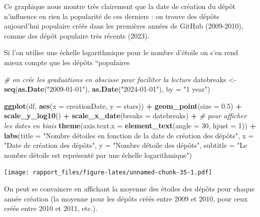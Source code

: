 \documentclass[
]{article}
\newenvironment{Shaded}{\begin{snugshade}}{\end{snugshade}}
\newcommand{\AttributeTok}[1]{\textcolor[rgb]{0.13,0.29,0.53}{#1}}
\newcommand{\CommentTok}[1]{\textcolor[rgb]{0.56,0.35,0.01}{\textit{#1}}}
\newcommand{\DecValTok}[1]{\textcolor[rgb]{0.00,0.00,0.81}{#1}}
\newcommand{\FloatTok}[1]{\textcolor[rgb]{0.00,0.00,0.81}{#1}}
\newcommand{\FunctionTok}[1]{\textcolor[rgb]{0.13,0.29,0.53}{\textbf{#1}}}
\newcommand{\NormalTok}[1]{#1}
\newcommand{\OtherTok}[1]{\textcolor[rgb]{0.56,0.35,0.01}{#1}}
\newcommand{\SpecialCharTok}[1]{\textcolor[rgb]{0.81,0.36,0.00}{\textbf{#1}}}
\newcommand{\StringTok}[1]{\textcolor[rgb]{0.31,0.60,0.02}{#1}}
\begin{document}
Ce graphique nous montre très clairement que la date de création du
dépôt n'influence en rien la popularité de ces derniers : on trouve des
dépôts aujourd'hui populaire créés dans les premières années de GitHub
(2009-2010), comme des dépôt populaire très récents (2023).

Si l'on utilise une échelle logarithmique pour le nombre d'étoile on
s'en rend mieux compte que les dépôts ``populaires

\begin{Shaded}
\begin{Highlighting}[]
\CommentTok{\# on crée les graduations en abscisse pour faciliter la lecture}
\NormalTok{datebreaks }\OtherTok{\textless{}{-}} \FunctionTok{seq}\NormalTok{(}\FunctionTok{as.Date}\NormalTok{(}\StringTok{"2009{-}01{-}01"}\NormalTok{), }\FunctionTok{as.Date}\NormalTok{(}\StringTok{"2024{-}01{-}01"}\NormalTok{), }\AttributeTok{by =} \StringTok{"1 year"}\NormalTok{)}

\FunctionTok{ggplot}\NormalTok{(df, }\FunctionTok{aes}\NormalTok{(}\AttributeTok{x =}\NormalTok{ creationDate, }\AttributeTok{y =}\NormalTok{ stars)) }\SpecialCharTok{+}
    \FunctionTok{geom\_point}\NormalTok{(}\AttributeTok{size =} \FloatTok{0.5}\NormalTok{) }\SpecialCharTok{+}
    \FunctionTok{scale\_y\_log10}\NormalTok{() }\SpecialCharTok{+}
    \FunctionTok{scale\_x\_date}\NormalTok{(}\AttributeTok{breaks =}\NormalTok{ datebreaks) }\SpecialCharTok{+}
    \CommentTok{\# pour afficher les dates en biais}
    \FunctionTok{theme}\NormalTok{(}\AttributeTok{axis.text.x =} \FunctionTok{element\_text}\NormalTok{(}\AttributeTok{angle =} \DecValTok{30}\NormalTok{, }\AttributeTok{hjust =} \DecValTok{1}\NormalTok{)) }\SpecialCharTok{+}
    \FunctionTok{labs}\NormalTok{(}\AttributeTok{title =} \StringTok{"Nombre d\textquotesingle{}étoiles en fonction de la date de}
\StringTok{         création des dépôts"}\NormalTok{,}
         \AttributeTok{x =} \StringTok{"Date de création des dépôts"}\NormalTok{,}
         \AttributeTok{y =} \StringTok{"Nombre d\textquotesingle{}étoile des dépôts"}\NormalTok{,}
         \AttributeTok{subtitle =} \StringTok{"Le nombre d\textquotesingle{}étoile est représenté par une échelle}
\StringTok{         logarithmique"}\NormalTok{)}
\end{Highlighting}
\end{Shaded}

\texttt{[image: rapport\_files/figure-latex/unnamed-chunk-35-1.pdf]}

On peut se convaincre en affichant la moyenne des étoiles des dépôts
pour chaque année création (la moyenne pour les dépôts créés entre 2009
et 2010, pour ceux créés entre 2010 et 2011, etc.).
\end{document}
